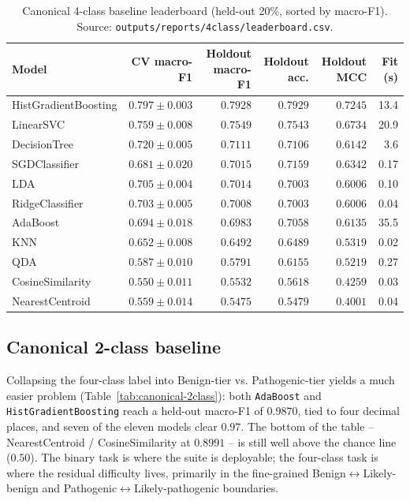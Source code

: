 \documentclass[11pt,a4paper]{article}
\begin{document}
\begin{table}[H]
\centering
\caption{Canonical 4-class baseline leaderboard (held-out 20\%, sorted by macro-F1).
Source: \texttt{outputs/reports/4class/leaderboard.csv}.}
\label{tab:canonical-4class}
\small
\begin{tabular}{lrrrrr}
\toprule
Model & CV macro-F1 & Holdout macro-F1 & Holdout acc. & Holdout MCC & Fit (s) \\
\midrule
HistGradientBoosting & $0.797\pm0.003$ & $0.7928$ & $0.7929$ & $0.7245$ & 13.4 \\
LinearSVC            & $0.759\pm0.008$ & $0.7549$ & $0.7543$ & $0.6734$ & 20.9 \\
DecisionTree         & $0.720\pm0.005$ & $0.7111$ & $0.7106$ & $0.6142$ & 3.6 \\
SGDClassifier        & $0.681\pm0.020$ & $0.7015$ & $0.7159$ & $0.6342$ & 0.17 \\
LDA                  & $0.705\pm0.004$ & $0.7014$ & $0.7003$ & $0.6006$ & 0.10 \\
RidgeClassifier      & $0.703\pm0.005$ & $0.7008$ & $0.7003$ & $0.6006$ & 0.04 \\
AdaBoost             & $0.694\pm0.018$ & $0.6983$ & $0.7058$ & $0.6135$ & 35.5 \\
KNN                  & $0.652\pm0.008$ & $0.6492$ & $0.6489$ & $0.5319$ & 0.02 \\
QDA                  & $0.587\pm0.010$ & $0.5791$ & $0.6155$ & $0.5219$ & 0.27 \\
CosineSimilarity     & $0.550\pm0.011$ & $0.5532$ & $0.5618$ & $0.4259$ & 0.03 \\
NearestCentroid      & $0.559\pm0.014$ & $0.5475$ & $0.5479$ & $0.4001$ & 0.04 \\
\bottomrule
\end{tabular}
\end{table}

\subsection{Canonical 2-class baseline}
\label{sec:canonical-2class}

Collapsing the four-class label into Benign-tier vs. Pathogenic-tier yields a
much easier problem (Table~\ref{tab:canonical-2class}): both
\texttt{AdaBoost} and \texttt{HistGradientBoosting} reach a held-out macro-F1
of $0.9870$, tied to four decimal places, and seven of the eleven models clear
$0.97$. The bottom of the table -- NearestCentroid / CosineSimilarity at
$0.8991$ -- is still well above the chance line ($0.50$). The binary task is
where the suite is deployable; the four-class task is where the residual
difficulty lives, primarily in the fine-grained Benign$\leftrightarrow$Likely-benign
and Pathogenic$\leftrightarrow$Likely-pathogenic boundaries.
\end{document}
